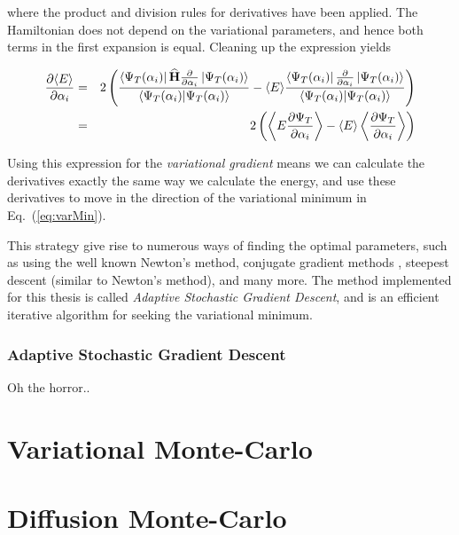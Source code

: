 where the product and division rules for derivatives have been applied. The Hamiltonian does not depend on the variational parameters, and hence both terms in the first expansion is equal. Cleaning up the expression yields

\begin{eqnarray}
 \frac{\partial \langle E\rangle}{\partial \alpha_i} &=& 2\left(\frac{\left< \Psi_T(\alpha_i) \right|{\bf\widehat{H}}\frac{\partial}{\partial \alpha_i}\left| \Psi_T(\alpha_i) \right>}{\left\langle \Psi_T(\alpha_i) | \Psi_T(\alpha_i)\right\rangle} - \langle E \rangle\frac{\left< \Psi_T(\alpha_i) \right|\frac{\partial}{\partial \alpha_i}\left| \Psi_T(\alpha_i) \right>}{\left\langle \Psi_T(\alpha_i) | \Psi_T(\alpha_i)\right\rangle} \right) \nonumber \\
  &=& 2\left(\left< E \frac{\partial \Psi_T}{\partial \alpha_i} \right> -\left< E\right>\left<\frac{\partial \Psi_T}{\partial \alpha_i} \right> \right)
\end{eqnarray}

Using this expression for the \textit{variational gradient} means we can calculate the derivatives exactly the same way we calculate the energy, and use these derivatives to move in the direction of the variational minimum in Eq.~(\ref{eq:varMin}). 

This strategy give rise to numerous ways of finding the optimal parameters, such as using the well known Newton's method, conjugate gradient methods \cite{golub1996matrix}, steepest descent (similar to Newton's method), and many more. 
The method implemented for this thesis is called \textit{Adaptive Stochastic Gradient Descent}, and is an efficient iterative algorithm for seeking the variational minimum. 

\subsubsection{Adaptive Stochastic Gradient Descent}

Oh the horror..

\section{Variational Monte-Carlo}
\label{sec:VMC}



\section{Diffusion Monte-Carlo}
\label{sec:DMC}




